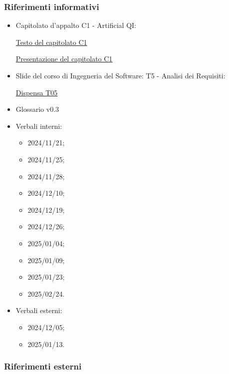 \subsubsection{Riferimenti informativi}
\label{subsubsec:RiferimentiInformativi}
\begin{itemize}
    \item Capitolato d'appalto C1 - Artificial QI:
    
    \href{https://www.math.unipd.it/~tullio/IS-1/2024/Progetto/C1.pdf}{Testo del capitolato C1}
    
    \href{https://www.math.unipd.it/~tullio/IS-1/2024/Progetto/C1p.pdf}{Presentazione del capitolato C1}
    
    \item Slide del corso di Ingegneria del Software: T5 - Analisi dei Requisiti:
    
    \href{https://www.math.unipd.it/~tullio/IS-1/2024/Dispense/T05.pdf}{Dispensa T05}
    
    \item Glossario v0.3
    
    \item Verbali interni:
    \begin{itemize}
        \item 2024/11/21;
        \item 2024/11/25;
        \item 2024/11/28;
        \item 2024/12/10;
        \item 2024/12/19;
        \item 2024/12/26;
        \item 2025/01/04;
        \item 2025/01/09;
        \item 2025/01/23;
        \item 2025/02/24.
    \end{itemize}
    
    \item Verbali esterni:
    \begin{itemize}
        \item 2024/12/05;
        \item 2025/01/13.
    \end{itemize}
\end{itemize}

\subsubsection{Riferimenti esterni}
\label{subsubsubsec:RiferimentiEsterni}